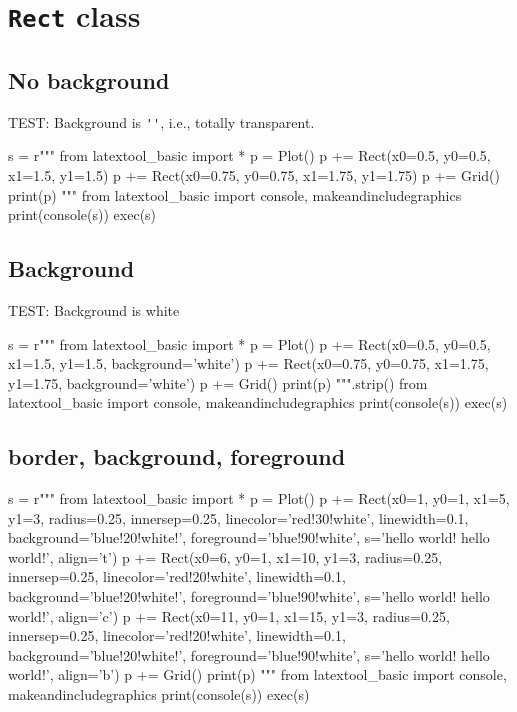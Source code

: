 \section{\texttt{Rect} class}


\subsection{No background}
TEST: Background is \verb!''!, i.e., totally transparent.
\begin{python}
s = r"""
from latextool_basic import *
p = Plot()
p += Rect(x0=0.5, y0=0.5, x1=1.5, y1=1.5)
p += Rect(x0=0.75, y0=0.75, x1=1.75, y1=1.75)
p += Grid()
print(p)
"""
from latextool_basic import console, makeandincludegraphics
print(console(s))
exec(s)
\end{python}


\subsection{Background}

TEST: Background is white
\begin{python}
s = r"""
from latextool_basic import *
p = Plot()
p += Rect(x0=0.5, y0=0.5, x1=1.5, y1=1.5, background='white')
p += Rect(x0=0.75, y0=0.75, x1=1.75, y1=1.75, background='white')
p += Grid()
print(p)
""".strip()
from latextool_basic import console, makeandincludegraphics
print(console(s))
exec(s)
\end{python}


\newpage
\subsection{border, background, foreground}
\begin{python}
s = r"""
from latextool_basic import *
p = Plot()
p += Rect(x0=1, y0=1, x1=5, y1=3,
          radius=0.25, innersep=0.25,
          linecolor='red!30!white', linewidth=0.1,
          background='blue!20!white!', foreground='blue!90!white', 
          s='hello world! hello world!', align='t')
p += Rect(x0=6, y0=1, x1=10, y1=3,
          radius=0.25, innersep=0.25,
          linecolor='red!20!white', linewidth=0.1,
          background='blue!20!white!', foreground='blue!90!white', 
          s='hello world! hello world!', align='c')
p += Rect(x0=11, y0=1, x1=15, y1=3,
          radius=0.25, innersep=0.25,
          linecolor='red!20!white', linewidth=0.1,
          background='blue!20!white!', foreground='blue!90!white', 
          s='hello world! hello world!', align='b')
p += Grid()
print(p)
"""
from latextool_basic import console, makeandincludegraphics
print(console(s))
exec(s)
\end{python}


